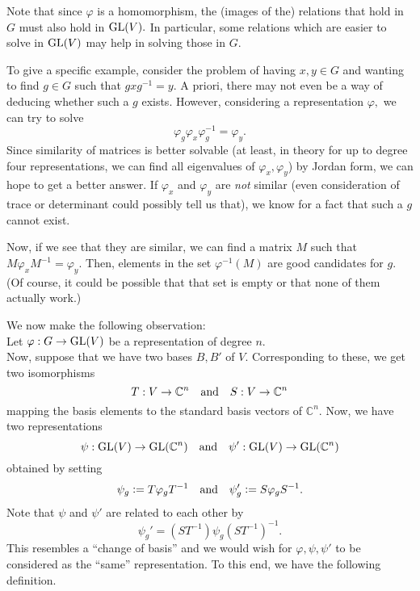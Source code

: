 \begin{ex}
	Note that since $\varphi$ is a homomorphism, the (images of the) relations that hold in $G$ must also hold in $\operatorname{GL}(V).$ In particular, some relations which are easier to solve in $\operatorname{GL}(V)$ may help in solving those in $G.$

	To give a specific example, consider the problem of having $x, y \in G$ and wanting to find $g \in G$ such that $gxg^{-1} = y.$ A priori, there may not even be a way of deducing whether such a $g$ exists. However, considering a representation $\varphi,$ we can try to solve
	\begin{equation*} 
		\varphi_g\varphi_x\varphi_g^{-1} = \varphi_y.
	\end{equation*}
	Since similarity of matrices is better solvable (at least, in theory for up to degree four representations, we can find all eigenvalues of $\varphi_x, \varphi_y$) by Jordan form, we can hope to get a better answer. If $\varphi_x$ and $\varphi_y$ are \emph{not} similar (even consideration of trace or determinant could possibly tell us that), we know for a fact that such a $g$ cannot exist.

	Now, if we see that they are similar, we can find a matrix $M$ such that $M\varphi_xM^{-1} = \varphi_y.$ Then, elements in the set $\varphi^{-1}(M)$ are good candidates for $g.$ (Of course, it could be possible that that set is empty or that none of them actually work.)
\end{ex}

We now make the following observation:\\
Let $\varphi : G \to \operatorname{GL}(V)$ be a representation of degree $n.$\\
Now, suppose that we have two bases $B, B'$ of $V.$ Corresponding to these, we get two isomorphisms
\begin{equation*} 
	T : V \to \mathbb{C}^n \quad\text{and}\quad S : V \to \mathbb{C}^n
\end{equation*}
mapping the basis elements to the standard basis vectors of $\mathbb{C}^n.$ Now, we have two representations
\begin{equation*} 
	\psi : \operatorname{GL} (V) \to \operatorname{GL} (\mathbb{C}^n) \quad\text{and}\quad \psi' : \operatorname{GL} (V) \to \operatorname{GL} (\mathbb{C}^n)
\end{equation*}
obtained by setting
\begin{equation*} 
	\psi_g \vcentcolon= T\varphi_gT^{-1} \quad\text{and}\quad \psi'_g \vcentcolon= S\varphi_gS^{-1}.
\end{equation*} 
Note that $\psi$ and $\psi'$ are related to each other by
\begin{equation*} 
	\psi_g' = (ST^{-1})\psi_g(ST^{-1})^{-1}.
\end{equation*}
This resembles a ``change of basis'' and we would wish for $\varphi, \psi, \psi'$ to be considered as the ``same'' representation. To this end, we have the following definition.

